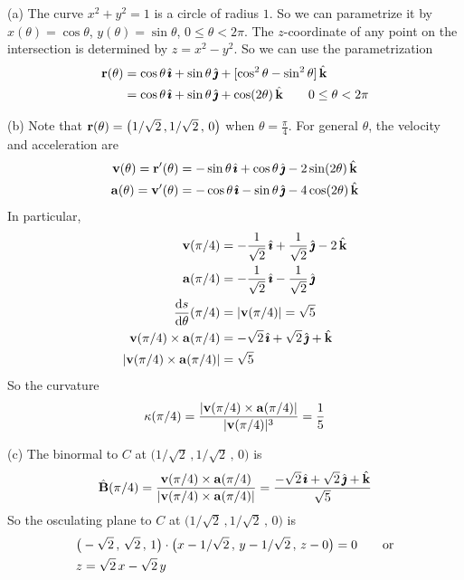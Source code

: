 \begin{solution}
(a)
The curve $x^2+y^2=1$ is a circle of radius $1$.
So we can parametrize it by $x(\theta)=\cos\theta$, 
$y(\theta)=\sin\theta$, $0\le\theta<2\pi$. The $z$-coordinate of any point on
the intersection is determined by $z=x^2-y^2$. So we can use the
parametrization
\begin{align*}
\mathbf{r}(\theta) &= \cos\theta\,\hat{\pmb{\imath}} +\sin\theta\,\hat{\pmb{\jmath}} + [\cos^2\theta-\sin^2\theta]\,\hat{\mathbf{k}}\\
            &=\cos\theta\,\hat{\pmb{\imath}} +\sin\theta\,\hat{\pmb{\jmath}} + \cos(2\theta)\,\hat{\mathbf{k}}
                        \qquad 0\le\theta<2\pi 
\end{align*}

(b) 
Note that $\mathbf{r}(\theta) = \big(1/\sqrt{2}\,,1/\sqrt{2}\,,\,0\big)$
when $\theta=\frac{\pi}{4}$.
For general $\theta$, the velocity and acceleration are
\begin{align*}
\mathbf{v}(\theta)=\mathbf{r}'(\theta)&=-\sin\theta\,\hat{\pmb{\imath}} + \cos\theta\,\hat{\pmb{\jmath}}  -2\sin(2\theta)\,\hat{\mathbf{k}} \\
\mathbf{a}(\theta)=\mathbf{v}'(\theta)&=-\cos\theta\,\hat{\pmb{\imath}} -\sin\theta\,\hat{\pmb{\jmath}}  -4\cos(2\theta)\,\hat{\mathbf{k}}
\end{align*}
In particular,
\begin{align*}
\vv(\pi/4)&=-\frac{1}{\sqrt{2}}\,\hi + \frac{1}{\sqrt{2}}\,\hj  -2\,\hk \\
\va(\pi/4)&=-\frac{1}{\sqrt{2}}\,\hi -\frac{1}{\sqrt{2}}\,\hj   \\
\diff{s}{\theta}(\pi/4) &= |\vv(\pi/4)|=\sqrt{5}\\
\vv(\pi/4)\times\va(\pi/4)&=-\sqrt{2}\,\hi +\sqrt{2}\,\hj + \hk\\
|\vv(\pi/4)\times\va(\pi/4)|&=\sqrt{5}
\end{align*}
So the curvature
\begin{equation*}
\kappa(\pi/4) = \frac{|\mathbf{v}(\pi/4)\times\mathbf{a}(\pi/4)|}{|\mathbf{v}(\pi/4)|^3}
 =\frac{1}{5}
\end{equation*}

(c) The binormal to $C$ at $\big(1/\sqrt{2}\,,1/\sqrt{2}\,,\,0\big)$ is
\begin{align*}
\hat{\mathbf{B}}(\pi/4) =\frac{\mathbf{v}(\pi/4)\times\mathbf{a}(\pi/4)}{|\mathbf{v}(\pi/4)\times\mathbf{a}(\pi/4)|}
                     =\frac{-\sqrt{2}\,\hat{\pmb{\imath}} +\sqrt{2}\,\hat{\pmb{\jmath}} + \hat{\mathbf{k}}}{\sqrt{5}}
\end{align*}
So the osculating plane to $C$ at $\big(1/\sqrt{2}\,,1/\sqrt{2}\,,\,0\big)$ is
\begin{align*}
&\big(-\sqrt{2}\,,\,\sqrt{2}\,,\,1\big)\cdot\big(x-1/\sqrt{2}\,,\,y-1/\sqrt{2}\,,\,z-0\big) = 0
\qquad{\rm or}\\
& z =\sqrt{2}\,x-\sqrt{2}\,y
\end{align*}


\end{solution}
